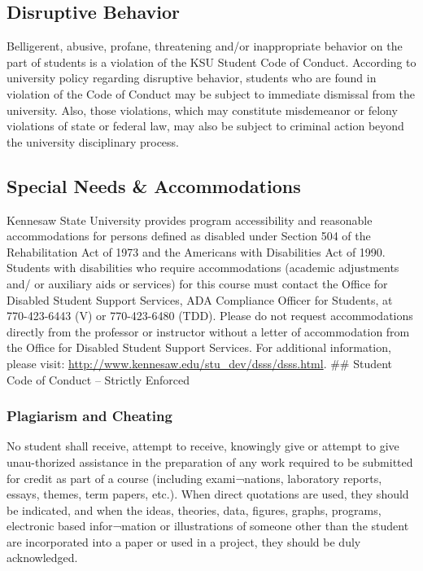 \documentclass[11pt,]{article}
\begin{document}
\hypertarget{disruptive-behavior}{%
\subsection{Disruptive Behavior}\label{disruptive-behavior}}

Belligerent, abusive, profane, threatening and/or inappropriate behavior on the part of students is a violation of
the KSU Student Code of Conduct. According to university policy regarding disruptive behavior, students who
are found in violation of the Code of Conduct may be subject to immediate dismissal from the university. Also,
those violations, which may constitute misdemeanor or felony violations of state or federal law, may also be
subject to criminal action beyond the university disciplinary process.

\hypertarget{special-needs-accommodations}{%
\subsection{Special Needs \& Accommodations}\label{special-needs-accommodations}}

Kennesaw State University provides program accessibility and reasonable accommodations for persons
defined as disabled under Section 504 of the Rehabilitation Act of 1973 and the Americans with
Disabilities Act of 1990. Students with disabilities who require accommodations (academic adjustments and/
or auxiliary aids or services) for this course must contact the Office for Disabled Student Support Services,
ADA Compliance Officer for Students, at 770-423-6443 (V) or 770-423-6480 (TDD). Please do not request
accommodations directly from the professor or instructor without a letter of accommodation from the
Office for Disabled Student Support Services. For additional information, please visit: \url{http://www.kennesaw.edu/stu_dev/dsss/dsss.html}.
\#\# Student Code of Conduct -- Strictly Enforced

\hypertarget{plagiarism-and-cheating}{%
\subsubsection{Plagiarism and Cheating}\label{plagiarism-and-cheating}}

No student shall receive, attempt to receive, knowingly give or attempt to give unau-thorized assistance in
the preparation of any work required to be submitted for credit as part of a course (including exami¬nations,
laboratory reports, essays, themes, term papers, etc.). When direct quotations are used, they should be
indicated, and when the ideas, theories, data, figures, graphs, programs, electronic based infor¬mation or
illustrations of someone other than the student are incorporated into a paper or used in a project, they should
be duly acknowledged.
\end{document}

